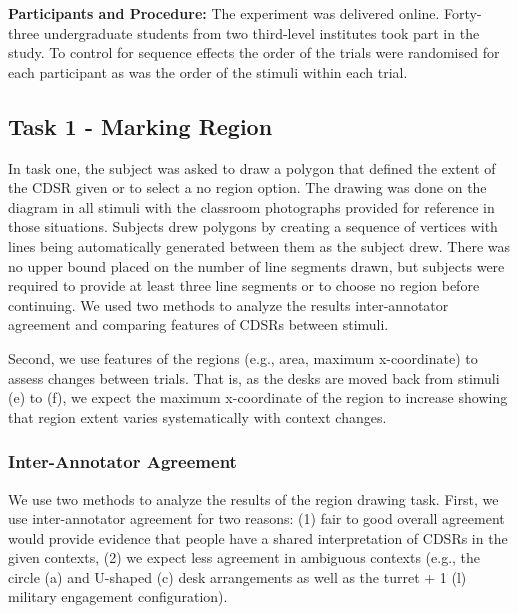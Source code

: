 \documentclass[11pt,letterpaper]{article}
\begin{document}
\textbf{Participants and Procedure:} The experiment was delivered online. Forty-three undergraduate students from two third-level institutes took part in the study. To control for sequence effects the order of the trials were randomised for each participant as was the order of the stimuli within each trial.   

\subsection{Task 1 - Marking Region}
In task one, the subject was asked to draw a polygon that defined the extent of the CDSR given or to select a no region option.  The drawing was done on the diagram in all stimuli with the classroom photographs provided for reference in those situations.  Subjects drew polygons by creating a sequence of vertices with lines being automatically generated between them as the subject drew.  There was no upper bound placed on the number of line segments drawn, but subjects were required to provide at least three line segments or to choose no region before continuing.  We used two methods to analyze the results inter-annotator agreement and comparing features of CDSRs between stimuli. 


Second, we use features of the regions (e.g., area, maximum x-coordinate) to assess changes between trials.  That is, as the desks are moved back from stimuli (e) to (f), we expect the maximum x-coordinate of the region to increase showing that region extent varies systematically with context changes.

\subsubsection{Inter-Annotator Agreement}

We use two methods to analyze the results of the region drawing task.  First, we use inter-annotator agreement for two reasons: (1) fair to good overall agreement would provide evidence that people have a shared interpretation of CDSRs in the given contexts, (2) we expect less agreement in ambiguous contexts (e.g., the circle (a) and U-shaped (c) desk arrangements as well as the turret + 1 (l) military engagement configuration).
\end{document}
